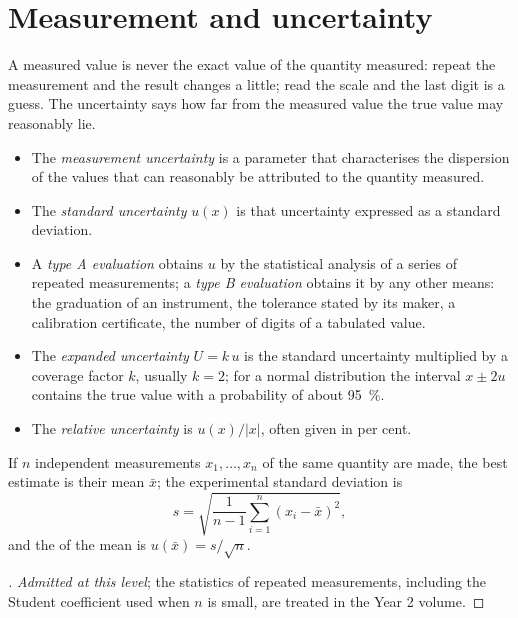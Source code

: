 \section{Measurement and uncertainty}

A measured value is never the exact value of the quantity measured: repeat
the measurement and the result changes a little; read the scale and the
last digit is a guess. The uncertainty says how far from the measured
value the true value may reasonably lie.

\begin{definition}\label{def:b1:lab-techniques-1:uncertainty}
\begin{itemize}
  \item The \emph{measurement uncertainty}
        is a parameter that characterises the dispersion of the values
        that can reasonably be attributed to the quantity measured.
  \item The \emph{standard uncertainty} $u(x)$
        is that uncertainty expressed as a standard deviation.
  \item A \emph{type A evaluation} obtains $u$ by
        the statistical analysis of a series of repeated measurements; a
        \emph{type B evaluation} obtains it by any
        other means: the graduation of an instrument, the tolerance stated
        by its maker, a calibration certificate, the number of digits of a
        tabulated value.
  \item The \emph{expanded uncertainty}
        $U = k\,u$ is the standard uncertainty multiplied by a coverage
        factor $k$, usually $k = 2$; for a normal distribution the
        interval $x \pm 2u$ contains the true value with a probability of
        about \qty{95}{\percent}.
  \item The \emph{relative uncertainty} is
        $u(x)/|x|$, often given in per cent.
\end{itemize}
\end{definition}

\begin{proposition}\label{prop:b1:lab-techniques-1:type-a}
If $n$ independent measurements $x_1, \dots, x_n$ of the same quantity are
made, the best estimate is their mean $\bar x$; the experimental standard
deviation is
\[
  s = \sqrt{\frac{1}{n-1} \sum_{i=1}^{n} (x_i - \bar x)^2},
\]
and the  of the mean is $u(\bar x) = s/\sqrt{n}$.
\end{proposition}
\begin{proof}[\omnameProof]
\emph{Admitted at this level}; the statistics of repeated measurements,
including the Student coefficient used when $n$ is small, are treated in
the Year 2 volume.
\end{proof}

